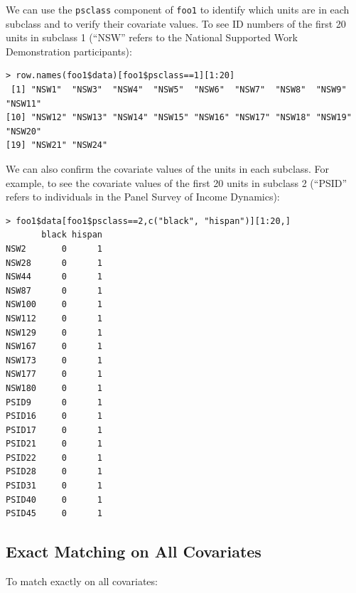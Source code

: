 \documentclass[oneside,letterpaper,titlepage]{article}
\begin{document}
We can use the {\tt psclass} component of {\tt foo1} to identify which
units are in each subclass and to verify their covariate values.
To see ID numbers of the first 20 units in subclass 1 (``NSW'' refers
to the National Supported Work Demonstration participants):
\begin{verbatim}
> row.names(foo1$data)[foo1$psclass==1][1:20]
 [1] "NSW1"  "NSW3"  "NSW4"  "NSW5"  "NSW6"  "NSW7"  "NSW8"  "NSW9"  "NSW11"
[10] "NSW12" "NSW13" "NSW14" "NSW15" "NSW16" "NSW17" "NSW18" "NSW19" "NSW20"
[19] "NSW21" "NSW24"
\end{verbatim}

We can also confirm the covariate values of the units in each subclass.  For example, to see the covariate
values of the first 20 units in subclass 2 (``PSID''
refers to individuals in the Panel Survey of Income Dynamics):
\begin{verbatim}
> foo1$data[foo1$psclass==2,c("black", "hispan")][1:20,]
       black hispan
NSW2       0      1
NSW28      0      1
NSW44      0      1
NSW87      0      1
NSW100     0      1
NSW112     0      1
NSW129     0      1
NSW167     0      1
NSW173     0      1
NSW177     0      1
NSW180     0      1
PSID9      0      1
PSID16     0      1
PSID17     0      1
PSID21     0      1
PSID22     0      1
PSID28     0      1
PSID31     0      1
PSID40     0      1
PSID45     0      1
\end{verbatim}

\subsection{Exact Matching on All Covariates}

To match exactly on all covariates:
\end{document}
